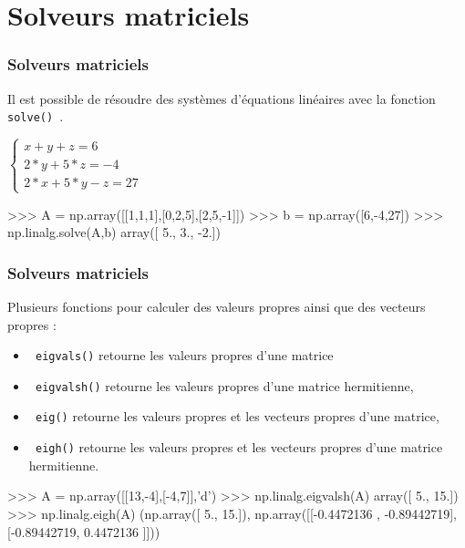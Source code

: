 \section{Solveurs matriciels}

\begin{frame}[fragile]
\frametitle{Solveurs matriciels}

Il est possible de résoudre des systèmes d'équations linéaires avec la fonction \verb? solve() ?.

\begin{center}
$\left\{\begin{array}{l}
x+y+z=6 \\ 2*y+5*z=-4 \\ 2*x+5*y-z=27
\end{array}\right.$
\end{center}

\begin{GrayBox}[0.85\textwidth]
\begin{verbatimtab}[3]
>>> A = np.array([[1,1,1],[0,2,5],[2,5,-1]])
>>> b = np.array([6,-4,27])
>>> np.linalg.solve(A,b)
array([ 5.,  3., -2.])
\end{verbatimtab}
\end{GrayBox}

\end{frame}

\begin{frame}[fragile]
\frametitle{Solveurs matriciels}
Plusieurs fonctions pour calculer des valeurs propres ainsi que des vecteurs propres :

\begin{itemize}
 \item \verb? eigvals()? retourne les valeurs propres d'une matrice
 \item \verb? eigvalsh()? retourne les valeurs propres d'une matrice hermitienne,
 \item \verb? eig()? retourne les valeurs propres et les vecteurs propres d'une matrice,
 \item \verb? eigh()? retourne les valeurs propres et les vecteurs propres d'une matrice hermitienne.
\end{itemize}

\begin{GrayBox}[0.85\textwidth]
\begin{verbatimtab}[3]
>>> A = np.array([[13,-4],[-4,7]],'d')
>>> np.linalg.eigvalsh(A)
array([  5.,  15.])
>>> np.linalg.eigh(A)
(np.array([  5.,  15.]), np.array([[-0.4472136 , -0.89442719],
        [-0.89442719,  0.4472136 ]]))
\end{verbatimtab}
\end{GrayBox}
\end{frame}


